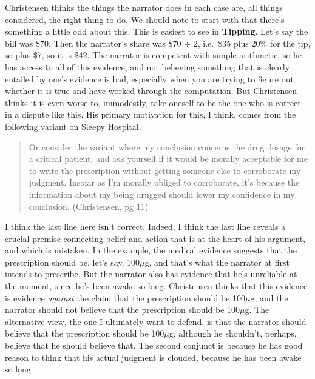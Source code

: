 \documentclass[
  10pt,
  letterpaper,
  DIV=11,
  numbers=noendperiod,
  twoside]{scrartcl}
\begin{document}
Christensen thinks the things the narrator does in each case are, all
things considered, the right thing to do. We should note to start with
that there's something a little odd about this. This is easiest to see
in \textbf{Tipping}. Let's say the bill was \$70. Then the narrator's
share was \$70 \(\div\) 2, i.e.~\$35 plus 20\% for the tip, so plus \$7,
so it is \$42. The narrator is competent with simple arithmetic, so he
has access to all of this evidence, and not believing something that is
clearly entailed by one's evidence is bad, especially when you are
trying to figure out whether it is true and have worked through the
computation. But Christensen thinks it is even worse to, immodestly,
take oneself to be the one who is correct in a dispute like this. His
primary motivation for this, I think, comes from the following variant
on Sleepy Hospital.

\begin{quote}
Or consider the variant where my conclusion concerns the drug dosage for
a critical patient, and ask yourself if it would be morally acceptable
for me to write the prescription without getting someone else to
corroborate my judgment. Insofar as I'm morally obliged to corroborate,
it's because the information about my being drugged should lower my
confidence in my conclusion. (Christensen, pg 11)
\end{quote}

I think the last line here isn't correct. Indeed, I think the last line
reveals a crucial premise connecting belief and action that is at the
heart of his argument, and which is mistaken. In the example, the
medical evidence suggests that the prescription should be, let's say,
100\(\mu\)g, and that's what the narrator at first intends to prescribe.
But the narrator also has evidence that he's unreliable at the moment,
since he's been awake so long. Christensen thinks that this evidence is
evidence \emph{against} the claim that the prescription should be
100\(\mu\)g, and the narrator should not believe that the prescription
should be 100\(\mu\)g. The alternative view, the one I ultimately want
to defend, is that the narrator should believe that the prescription
should be 100\(\mu\)g, although he shouldn't, perhaps, believe that he
should believe that. The second conjunct is because he has good reason
to think that his actual judgment is clouded, because he has been awake
so long.
\end{document}
